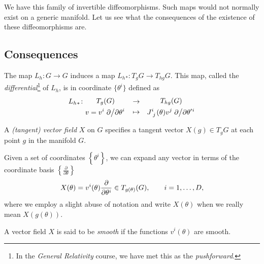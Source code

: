 We have this family of invertible diffeomorphisms. Such maps would not normally exist on a generic manifold. Let us see what the consequences of the existence of these diffeomorphisms are.

\subsection*{Consequences}%

\begin{wrapfigure}{R}{0.35\columnwidth}
  \centering
  \def\svgwidth{0.3\columnwidth}
  
  \label{fig:l8f2}
\end{wrapfigure}

The map $L_h \colon G \to G$ induces a map $L_h{}_*: T_g G \to T_{hg} G$.
This map, called the \emph{differential}\footnote{In the \emph{General Relativity} course, we have met this as the \emph{pushforward}.} of $L_h$, is in coordinate $\{\theta^i\}$ defined as
\begin{equation}
  \begin{gathered}
    L_h{}_* \colon \\
    \qquad
  \end{gathered}
  \begin{gathered}
    T_g (G) \\
    v= v^{i} \flatfrac{\partial }{\partial \theta^{i}}
  \end{gathered}
  \quad
  \begin{gathered}
    \to \\
    \mapsto
  \end{gathered}
  \quad
  \begin{gathered}
    T_{hg} (G) \\
    J\indices{^{i}_{j}}(\theta) v^{j} \flatfrac{\partial }{\partial \theta'{}^{i}}
  \end{gathered}
\end{equation}

\begin{definition}[]
  A \emph{(tangent) vector field} $X$ on $G$ specifies a tangent vector $X(g) \in T_gG$ at each point $g$ in the manifold $G$.
\end{definition}
Given a set of coordinates $\left\{ \theta^{i} \right\}$, we can expand any vector in terms of the coordinate basis $\left\{ \frac{\partial }{\partial \theta} \right\}$ 
\begin{equation}
  X(\theta) = v^i(\theta) \pdv{}{\theta^i} \in T_{g(\theta)}(G), \qquad i = 1, \dots, D,
\end{equation}
where we employ a slight abuse of notation and write $X(\theta)$ when we really mean $X(g(\theta))$.
\begin{definition}[]
  A vector field $X$ is said to be \emph{smooth} if the functions $v^i(\theta)$ are smooth.
\end{definition}

